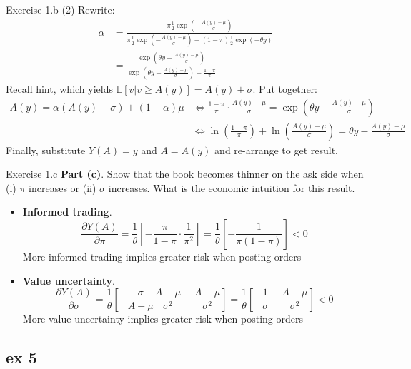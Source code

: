 \documentclass[english,10pt]{beamer}
\begin{document}
\begin{frame}{Exercise 1.b (2)}
	Rewrite:
	\begin{align*}
	\alpha 
	& =\frac{\pi \frac{1}{2} \exp(-\frac{A(y)-\mu}{\sigma})}{\pi \frac{1}{2} \exp(-\frac{A(y)-\mu}{\sigma})+(1-\pi)\frac{1}{2}\exp(-\theta y)} \\
	& = \frac{\exp(\theta y-\frac{A(y)-\mu}{\sigma})}{\exp(\theta y-\frac{A(y)-\mu}{\sigma})+\frac{1-\pi}{\pi}} 
	\end{align*}
	Recall hint, which yields $\mathbb{E}[v|v \ge A(y)]=A(y)+\sigma$. Put together:
	\begin{align*}
	A(y)=\alpha(A(y)+\sigma)+(1-\alpha) \mu & \Leftrightarrow \frac{1-\pi}{\pi}\cdot \frac{A(y)-\mu}{\sigma}=\exp(\theta y-\frac{A(y)-\mu}{\sigma})  \\
	& \Leftrightarrow \ln( \frac{1-\pi}{\pi}) + \ln (\frac{A(y)-\mu}{\sigma})=\theta y-\frac{A(y)-\mu}{\sigma} 
	\end{align*}
	Finally, substitute $Y(A)=y$ and $A=A(y)$ and re-arrange to get result.
\end{frame}


\begin{frame}{Exercise 1.c}
	\textbf{Part (c)}. Show that the book becomes thinner on the ask side when (i) $\pi$ increases or (ii) $\sigma$ increases. What is the economic intuition for this result.
	\smallskip
	\smallskip
	\begin{itemize}
		\item \textbf{Informed trading}. 
		\[
		\frac{\partial Y(A)}{\partial \pi} = \frac{1}{\theta}\left[ -\frac{\pi}{1-\pi}\cdot \frac{1}{\pi^2}\right]=\frac{1}{\theta}\left[ -\frac{1}{\pi(1-\pi)}\right]<0
		\]
		More informed trading implies greater risk when posting orders
		\item \textbf{Value uncertainty}. 
		\[
		\frac{\partial Y(A)}{\partial \sigma} = \frac{1}{\theta} \left[ -\frac{\sigma}{A-\mu}\frac{A-\mu}{\sigma^2} - \frac{A-\mu}{\sigma^2}\right]=\frac{1}{\theta} \left[ -\frac{1}{\sigma} - \frac{A-\mu}{\sigma^2}\right]<0
		\]
		More value uncertainty implies greater risk when posting orders \hyperlink{exercises}{}
	\end{itemize}
\end{frame}



\subsection{ex 5}
\end{document}
